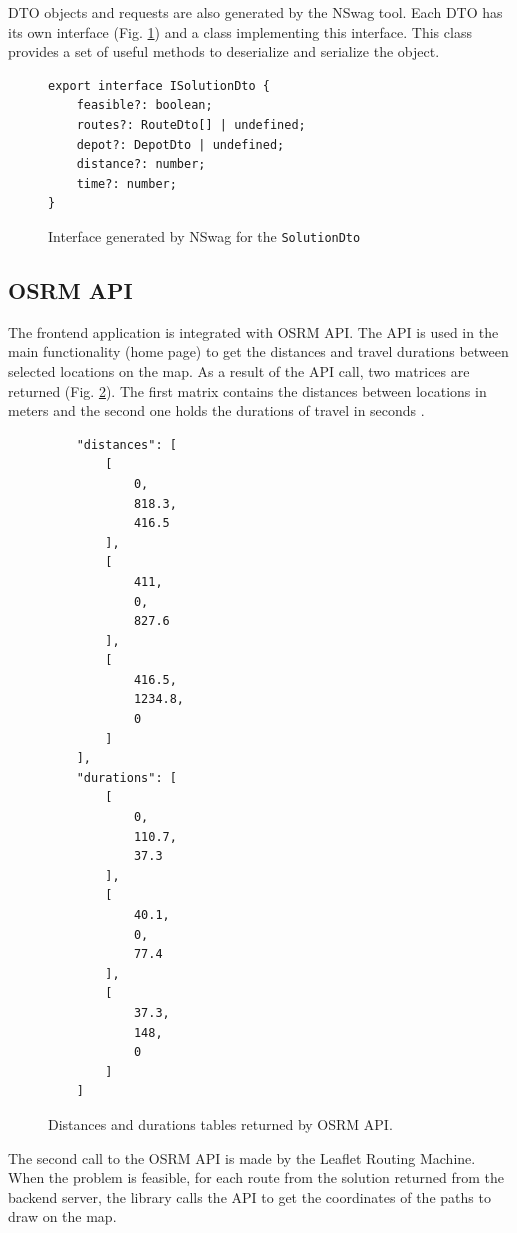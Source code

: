 \documentclass[a4paper,twoside,12pt]{book}
\begin{document}
DTO objects and requests are also generated by the NSwag tool. Each DTO has its own interface (Fig. \ref{fig:dtoInterface}) and a class implementing this interface. This class provides a set of useful methods to deserialize and serialize the object. 

\begin{figure}[htb]
\centering
\begin{lstlisting}
export interface ISolutionDto {
    feasible?: boolean;
    routes?: RouteDto[] | undefined;
    depot?: DepotDto | undefined;
    distance?: number;
    time?: number;
}
\end{lstlisting}
\caption{Interface generated by NSwag for the \lstinline{SolutionDto}}
\label{fig:dtoInterface}
\end{figure}

\subsection{OSRM API}

The frontend application is integrated with OSRM API. The API is used in the main functionality (home page) to get the distances and travel durations between selected locations on the map. As a result of the API call, two matrices are returned (Fig. \ref{fig:osrmAPI}). The first matrix contains the distances between locations in meters and the second one holds the durations of travel in seconds \cite{bib:osrmAPI}. 

\begin{figure}[htb]
\centering
\begin{lstlisting}
    "distances": [
        [
            0,
            818.3,
            416.5
        ],
        [
            411,
            0,
            827.6
        ],
        [
            416.5,
            1234.8,
            0
        ]
    ],
    "durations": [
        [
            0,
            110.7,
            37.3
        ],
        [
            40.1,
            0,
            77.4
        ],
        [
            37.3,
            148,
            0
        ]
    ]
\end{lstlisting}
\caption{Distances and durations tables returned by OSRM API.}
\label{fig:osrmAPI}
\end{figure}

The second call to the OSRM API is made by the Leaflet Routing Machine. When the problem is feasible, for each route from the solution returned from the backend server, the library calls the API to get the coordinates of the paths to draw on the map. 
\end{document}
